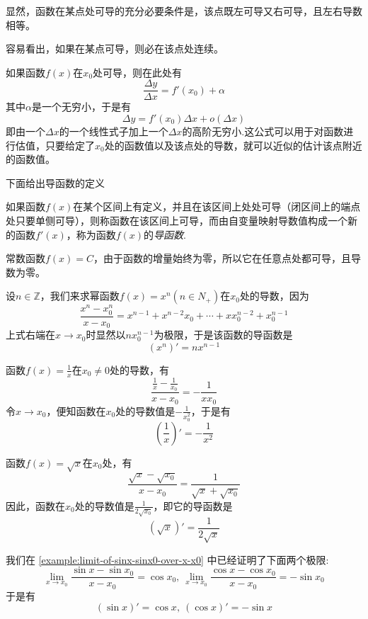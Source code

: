 显然，函数在某点处可导的充分必要条件是，该点既左可导又右可导，且左右导数相等。

容易看出，如果在某点可导，则必在该点处连续。

如果函数$f(x)$在$x_0$处可导，则在此处有
\[ \frac{\Delta y}{\Delta x} = f'(x_0)+\alpha \]
其中$\alpha$是一个无穷小，于是有
\[ \Delta y = f'(x_0)\Delta x + o(\Delta x) \]
即由一个$\Delta x$的一个线性式子加上一个$\Delta x$的高阶无穷小.这公式可以用于对函数进行估值，只要给定了$x_0$处的函数值以及该点处的导数，就可以近似的估计该点附近的函数值。

下面给出导函数的定义
\begin{definition}
  如果函数$f(x)$在某个区间上有定义，并且在该区间上处处可导（闭区间上的端点处只要单侧可导），则称函数在该区间上可导，而由自变量映射导数值构成一个新的函数$f'(x)$，称为函数$f(x)$的\emph{导函数}.
\end{definition}

\begin{example}
  常数函数$f(x)=C$，由于函数的增量始终为零，所以它在任意点处都可导，且导数为零。
\end{example}

\begin{example}
  设$n \in \mathbb{Z}$，我们来求幂函数$f(x)=x^n(n \in N_+)$在$x_0$处的导数，因为
  \[ \frac{x^n-x_0^n}{x-x_0} = x^{n-1}+x^{n-2}x_0+\cdots+xx_0^{n-2}+x_0^{n-1} \]
  上式右端在$x \to x_0$时显然以$nx_0^{n-1}$为极限，于是该函数的导函数是
  \[ (x^n)' = nx^{n-1} \]
\end{example}

\begin{example}
  函数$f(x)=\frac{1}{x}$在$x_0 \neq 0$处的导数，有
  \[ \frac{\frac{1}{x}-\frac{1}{x_0}}{x-x_0} = - \frac{1}{xx_0} \]
  令$x \to x_0$，便知函数在$x_0$处的导数值是$-\frac{1}{x_0^2}$，于是有
  \[ \left( \frac{1}{x} \right)' = - \frac{1}{x^2} \]
\end{example}

\begin{example}
  函数$f(x)=\sqrt{x}$在$x_0$处，有
  \[ \frac{\sqrt{x}-\sqrt{x_0}}{x-x_0} = \frac{1}{\sqrt{x}+\sqrt{x_0}} \]
  因此，函数在$x_0$处的导数值是$\frac{1}{2 \sqrt{x_0}}$，即它的导函数是
  \[ \left( \sqrt{x} \right) ' = \frac{1}{2 \sqrt{x}} \]
\end{example}

\begin{example}
 我们在 \autoref{example:limit-of-sinx-sinx0-over-x-x0} 中已经证明了下面两个极限:
  \[ \lim_{x \to x_0} \frac{\sin{x}-\sin{x_0}}{x-x_0} = \cos{x_0}, \  
   \lim_{x \to x_0} \frac{\cos{x}-\cos{x_0}}{x-x_0} = -\sin{x_0} \]
 于是有
 \[ (\sin{x})' = \cos{x}, \  (\cos{x})' = - \sin{x} \]
\end{example}

